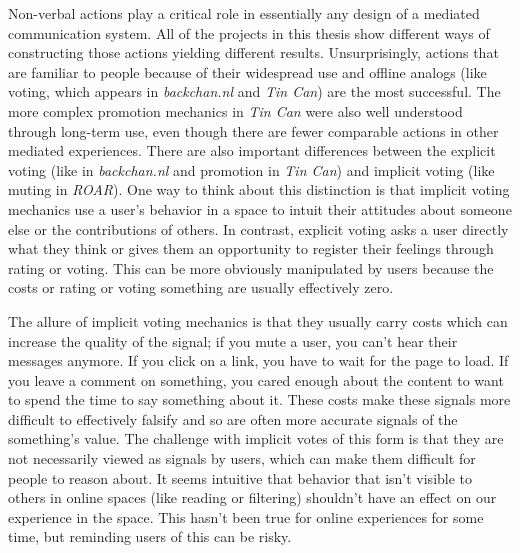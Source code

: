 Non-verbal actions play a critical role in essentially any design of a mediated communication system. All of the projects in this thesis show different ways of constructing those actions yielding different results. Unsurprisingly, actions that are familiar to people because of their widespread use and offline analogs (like voting, which appears in \emph{backchan.nl} and \emph{Tin Can}) are the most successful. The more complex promotion mechanics in \emph{Tin Can} were also well understood through long-term use, even though there are fewer comparable actions in other mediated experiences. There are also important differences between the explicit voting (like in \emph{backchan.nl} and promotion in \emph{Tin Can}) and implicit voting (like muting in \emph{ROAR}). One way to think about this distinction is that implicit voting mechanics use a user's behavior in a space to intuit their attitudes about someone else or the contributions of others.  In contrast, explicit voting asks a user directly what they think or gives them an opportunity to register their feelings through rating or voting. This can be more obviously manipulated by users because the costs or rating or voting something are usually effectively zero.

The allure of implicit voting mechanics is that they usually carry costs which can increase the quality of the signal; if you mute a user, you can't hear their messages anymore. If you click on a link, you have to wait for the page to load. If you leave a comment on something, you cared enough about the content to want to spend the time to say something about it. These costs make these signals more difficult to effectively falsify and so are often more accurate signals of the something's value. The challenge with implicit votes of this form is that they are not necessarily viewed as signals by users, which can make them difficult for people to reason about. It seems intuitive that behavior that isn't visible to others in online spaces (like reading or filtering) shouldn't have an effect on our experience in the space. This hasn't been true for online experiences for some time, but reminding users of this can be risky.

